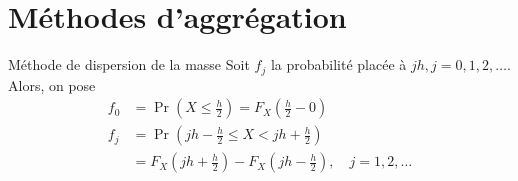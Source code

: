 \chapter{Méthodes d'aggrégation}


\begin{definition}{Méthode de dispersion de la masse}{}
	Soit $f_j$ la probabilité placée à $jh, j = 0, 1, 2, \dots$. Alors, on pose 
	\begin{align*}
	f_0 &= \Pr \left(X \leq \frac{h}{2}\right) = F_X\left(\frac{h}{2} - 0\right)\\
	f_j &= \Pr \left(jh - \frac{h}{2} \leq X < jh + \frac{h}{2}\right)\\
	&=  F_X\left(jh + \frac{h}{2}\right) - F_X\left(jh - \frac{h}{2}\right), \quad j = 1, 2, \dots \\
	\end{align*}
\end{definition}